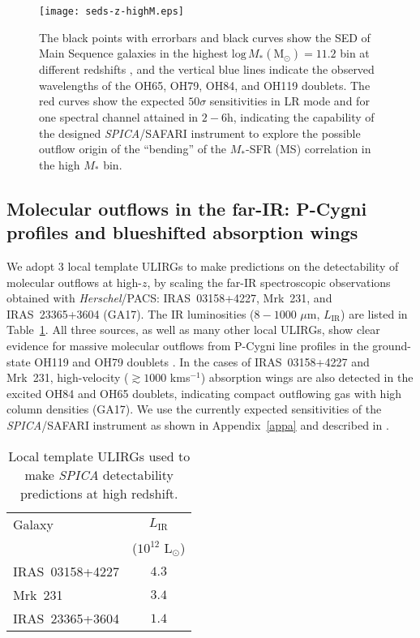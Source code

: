 \documentclass{pasa}%
\newcommand{\kms}{{\hbox {km\thinspace s$^{-1}$}}}
\begin{document}
\begin{figure*}
\begin{center}
\texttt{[image: seds-z-highM.eps]}
\caption{The black points with errorbars and black curves show the SED of Main
  Sequence galaxies in the highest $\mathrm{log}\,M_*(\mathrm{M_{\odot}})=11.2$
  bin at different redshifts \citep[from][]{sch15}, and the vertical
  blue lines indicate the observed wavelengths of the OH65, OH79, OH84, and
  OH119 doublets. The red curves show the expected $50\sigma$ sensitivities in
  LR mode and for one spectral channel attained in $2-6$h, indicating the
  capability of the designed {\it SPICA}/SAFARI instrument to explore the
  possible outflow origin of the ``bending'' of the 
  $M_*$-SFR (MS) correlation in the high $M_*$ bin.
} 
\label{ms}
\end{center}
\end{figure*}

\subsection{Molecular outflows in the far-IR: P-Cygni profiles and blueshifted
  absorption wings}

We adopt 3 local template ULIRGs to make predictions on the
detectability of molecular outflows at high-$z$, by 
scaling the far-IR spectroscopic observations obtained with 
{\it Herschel}/PACS: IRAS~03158+4227, Mrk~231, and IRAS~23365+3604 (GA17). 
The IR luminosities ($8-1000$ $\mu$m, $L_{\mathrm{IR}}$) are listed in
Table~\ref{tab1}. All three sources, as well as many other local ULIRGs, show
clear evidence for massive molecular outflows from P-Cygni line profiles in
the ground-state OH119 and OH79 doublets \citep[e.g.][]{fis10}. In the cases
of IRAS~03158+4227 and Mrk~231, high-velocity ($\gtrsim1000$ \kms) absorption
wings are also detected 
in the excited OH84 and OH65 doublets, indicating compact outflowing gas with
high column densities (GA17). We use the currently expected sensitivities of
the {\it SPICA}/SAFARI instrument as shown in Appendix~\ref{appa} and 
described in \cite{roe17}.


\begin{table}
\caption{Local template ULIRGs used to make {\it SPICA} detectability
  predictions at high redshift.} 
\begin{center}
\begin{tabular}{lc}
\hline\hline
Galaxy & $L_{\mathrm{IR}}$ \\
       & ($10^{12}$ L$_{\mathrm{\odot}}$) \\
\hline
 IRAS~03158+4227  & $4.3$ \\
 Mrk~231          & $3.4$ \\ 
 IRAS~23365+3604  & $1.4$ \\ 
\hline\hline
\end{tabular}
\end{center}
\label{tab1}
\end{table}
\end{document}
